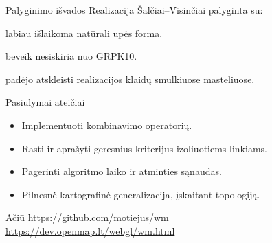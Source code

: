 \documentclass[14pt]{beamer}
\begin{document}
\begin{frame}{Palyginimo išvados}
  Realizacija Šalčiai--Visinčiai palyginta su:
  \begin{description}[<+->]

    \item[D\&P, V--W (+Chaikin):] labiau išlaikoma natūrali
      upės forma.

    \item[GRPK50:] beveik nesiskiria nuo GRPK10.

    \item[GRPK250:] padėjo atskleisti realizacijos klaidų smulkiuose
      masteliuose.

  \end{description}
\end{frame}

\begin{frame}{Pasiūlymai ateičiai}
  \begin{itemize}[<+->]
    \item Implementuoti kombinavimo operatorių.
    \item Rasti ir aprašyti geresnius kriterijus izoliuotiems linkiams.
    \item Pagerinti algoritmo laiko ir atminties sąnaudas.
    \item Pilnesnė kartografinė generalizacija, įskaitant topologiją.
  \end{itemize}
\end{frame}

\begin{frame}{Ačiū}
  \url{https://github.com/motiejus/wm} \\[.5em]
  \url{https://dev.openmap.lt/webgl/wm.html}
\end{frame}
\end{document}

